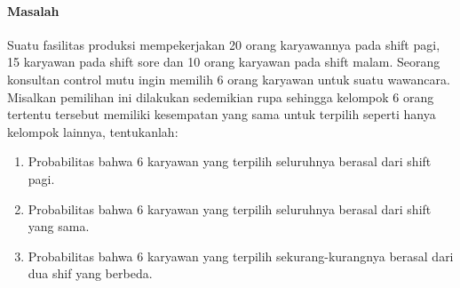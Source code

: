 \documentclass[a4paper,12pt]{article}
\begin{document}
\paragraph{Masalah\\}
Suatu fasilitas produksi mempekerjakan 20 orang karyawannya pada shift pagi, 15 karyawan pada shift sore dan 10 orang karyawan pada shift malam. Seorang konsultan control mutu ingin memilih 6 orang karyawan untuk suatu wawancara. Misalkan pemilihan ini dilakukan sedemikian rupa sehingga kelompok 6 orang tertentu tersebut memiliki kesempatan yang sama untuk terpilih seperti hanya kelompok lainnya, tentukanlah: 
\begin{enumerate}[label=\alph*.]
	\item Probabilitas bahwa 6 karyawan yang terpilih seluruhnya berasal dari shift pagi. 
	\item Probabilitas bahwa 6 karyawan yang terpilih seluruhnya berasal dari shift yang sama. 
	\item Probabilitas bahwa 6 karyawan yang terpilih sekurang-kurangnya berasal dari dua shif yang berbeda.
\end{enumerate}
\end{document}
